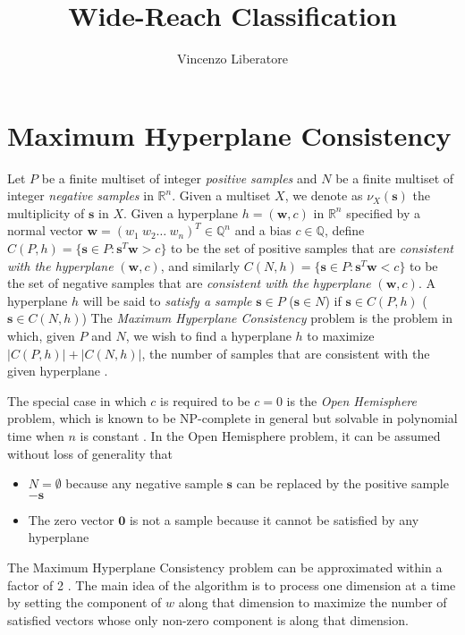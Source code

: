 \documentclass[11pt]{article}
\title{Wide-Reach Classification}
\author{Vincenzo Liberatore}
\theoremstyle{definition}
\newcommand{\R}{\mathbb{R}}
\newcommand{\Q}{\mathbb{Q}}
\newcommand{\vect}[1]{\mathbf{#1}}
\begin{document}
\maketitle

\section{Maximum Hyperplane Consistency}
Let $P$ be a finite multiset of integer {\em positive samples\/} and 
$N$ be a finite multiset of integer {\em negative samples\/} in $\R^n$.
Given a multiset $X$, we denote as $\nu_X(\vect{s})$ the multiplicity of $\vect{s}$ in $X$. 
Given a hyperplane $h = (\vect{w}, c)$ in $\R^n$ 
specified by a normal vector $\vect{w} = (w_1 ~ w_2 \dots ~ w_n)^T \in \Q^n$ and a bias $c \in \Q$,
define $C(P, h) = \{ \vect{s} \in P : \vect{s}^T \vect{w} > c \}$
to be the set of positive samples that are {\em consistent with the hyperplane\/} $(\vect{w}, c)$,
and similarly $C(N, h) = \{ \vect{s} \in P : \vect{s}^T \vect{w} < c \}$
to be the set of negative samples that are {\em consistent with the hyperplane\/} $(\vect{w}, c)$.
A hyperplane $h$ will be said to {\em satisfy a sample\/} 
$\vect{s} \in P$ ($\vect{s} \in N$)
if $\vect{s} \in C(P, h)$ ($\vect{s} \in C(N, h)$)
The {\em Maximum Hyperplane Consistency\/} problem is the problem in which,
given $P$ and $N$, we wish to find a hyperplane $h$
to maximize $|C(P, h)| + |C(N, h)|$, the number of samples 
that are consistent with the given hyperplane \cite{countingapprox}.


The special case in which $c$ is required to be $c = 0$ is the {\em Open Hemisphere\/} problem,
which is known to be NP-complete in general but solvable in polynomial time
when $n$ is constant \cite{densehemisphere}.
In the Open Hemisphere problem, it can be assumed without loss of generality that 
\begin{itemize} 
\item $N = \emptyset$ because 
any negative sample $\vect{s}$ can be replaced by the positive sample $-\vect{s}$
\item The zero vector $\vect{0}$ is not a sample because it cannot be satisfied by any hyperplane
\end{itemize}

The Maximum Hyperplane Consistency problem can be approximated within a factor of 2 \cite{countingapprox}.
The main idea of the algorithm is to process one dimension at a time 
by setting the component of $w$ along that dimension to maximize the number of satisfied vectors
whose only non-zero component is along that dimension.
\end{document}
